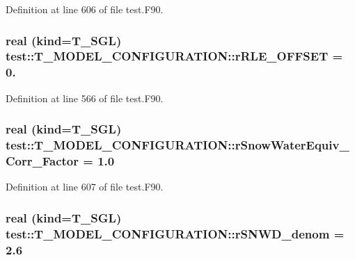 Definition at line 606 of file test.F90.

\hypertarget{typetest_1_1_t___m_o_d_e_l___c_o_n_f_i_g_u_r_a_t_i_o_n_ac5a30fe2f8e468f1e65ec6f9f4b89412}{
\subsubsection[{rRLE\_\-OFFSET}]{\setlength{\rightskip}{0pt plus 5cm}real (kind={\bf T\_\-SGL}) {\bf test::T\_\-MODEL\_\-CONFIGURATION::rRLE\_\-OFFSET} = 0.}}
\label{typetest_1_1_t___m_o_d_e_l___c_o_n_f_i_g_u_r_a_t_i_o_n_ac5a30fe2f8e468f1e65ec6f9f4b89412}


Definition at line 566 of file test.F90.

\hypertarget{typetest_1_1_t___m_o_d_e_l___c_o_n_f_i_g_u_r_a_t_i_o_n_af70aeb6ad8adf4758b3adf82e51787a8}{
\subsubsection[{rSnowWaterEquiv\_\-Corr\_\-Factor}]{\setlength{\rightskip}{0pt plus 5cm}real (kind={\bf T\_\-SGL}) {\bf test::T\_\-MODEL\_\-CONFIGURATION::rSnowWaterEquiv\_\-Corr\_\-Factor} = 1.0}}
\label{typetest_1_1_t___m_o_d_e_l___c_o_n_f_i_g_u_r_a_t_i_o_n_af70aeb6ad8adf4758b3adf82e51787a8}


Definition at line 607 of file test.F90.

\hypertarget{typetest_1_1_t___m_o_d_e_l___c_o_n_f_i_g_u_r_a_t_i_o_n_a00628b420041af8bfe792df855c27868}{
\subsubsection[{rSNWD\_\-denom}]{\setlength{\rightskip}{0pt plus 5cm}real (kind={\bf T\_\-SGL}) {\bf test::T\_\-MODEL\_\-CONFIGURATION::rSNWD\_\-denom} = 2.6}}
\label{typetest_1_1_t___m_o_d_e_l___c_o_n_f_i_g_u_r_a_t_i_o_n_a00628b420041af8bfe792df855c27868}


